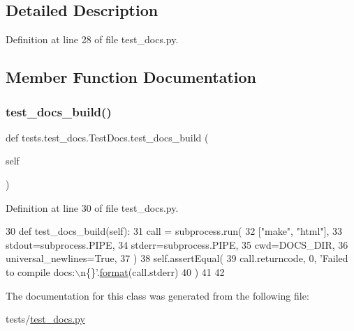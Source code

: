 \subsection{Detailed Description}


Definition at line 28 of file test\+\_\+docs.\+py.



\subsection{Member Function Documentation}
\mbox{\label{classtests_1_1test__docs_1_1TestDocs_ad8142c9573a84626d58a8d26cf2ac695}} 
\subsubsection{\texorpdfstring{test\+\_\+docs\+\_\+build()}{test\_docs\_build()}}
{\footnotesize\ttfamily def tests.\+test\+\_\+docs.\+Test\+Docs.\+test\+\_\+docs\+\_\+build (\begin{DoxyParamCaption}\item[{}]{self }\end{DoxyParamCaption})}



Definition at line 30 of file test\+\_\+docs.\+py.


\begin{DoxyCode}
30     \textcolor{keyword}{def }test\_docs\_build(self):
31         call = subprocess.run(
32             [\textcolor{stringliteral}{"make"}, \textcolor{stringliteral}{"html"}],
33             stdout=subprocess.PIPE,
34             stderr=subprocess.PIPE,
35             cwd=DOCS\_DIR,
36             universal\_newlines=\textcolor{keyword}{True},
37         )
38         self.assertEqual(
39             call.returncode, 0, \textcolor{stringliteral}{'Failed to compile docs:\(\backslash\)n\{\}'}.\hyperlink{namespaceparlai_1_1chat__service_1_1services_1_1messenger_1_1shared__utils_a32e2e2022b824fbaf80c747160b52a76}{format}(call.stderr)
40         )
41 
42 
\end{DoxyCode}


The documentation for this class was generated from the following file\+:\begin{DoxyCompactItemize}
\item 
tests/\hyperlink{test__docs_8py}{test\+\_\+docs.\+py}\end{DoxyCompactItemize}
